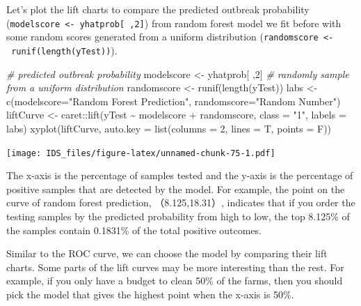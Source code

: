 \documentclass[
  12pt,
]{krantz}
\makeatletter
\newenvironment{Shaded}{\begin{snugshade}}{\end{snugshade}}
\newcommand{\AttributeTok}[1]{\textcolor[rgb]{0.61,0.61,0.61}{#1}}
\newcommand{\CommentTok}[1]{\textcolor[rgb]{0.37,0.37,0.37}{\textit{#1}}}
\newcommand{\DecValTok}[1]{\textcolor[rgb]{0.06,0.06,0.06}{#1}}
\newcommand{\FunctionTok}[1]{\textcolor[rgb]{0,0,0}{#1}}
\newcommand{\NormalTok}[1]{#1}
\newcommand{\OtherTok}[1]{\textcolor[rgb]{0.37,0.37,0.37}{#1}}
\newcommand{\SpecialCharTok}[1]{\textcolor[rgb]{0,0,0}{#1}}
\newcommand{\StringTok}[1]{\textcolor[rgb]{0.5,0.5,0.5}{#1}}
\newenvironment{kframe}{%
\medskip{}
\setlength{\fboxsep}{.8em}
 \def\at@end@of@kframe{}%
 \ifinner\ifhmode%
  \def\at@end@of@kframe{\end{minipage}}%
  \begin{minipage}{\columnwidth}%
 \fi\fi%
 \def\FrameCommand##1{\hskip\@totalleftmargin \hskip-\fboxsep
 \colorbox{shadecolor}{##1}\hskip-\fboxsep
     \hskip-\linewidth \hskip-\@totalleftmargin \hskip\columnwidth}%
 \MakeFramed {\advance\hsize-\width
   \@totalleftmargin\z@ \linewidth\hsize
   \@setminipage}}%
 {\par\unskip\endMakeFramed%
 \at@end@of@kframe}
\renewenvironment{Shaded}{\begin{kframe}}{\end{kframe}}
\makeatother
\begin{document}
Let's plot the lift charts to compare the predicted outbreak probability (\texttt{modelscore\ \textless{}-\ yhatprob{[}\ ,2{]}}) from random forest model we fit before with some random scores generated from a uniform distribution (\texttt{randomscore\ \textless{}-\ runif(length(yTest))}).

\begin{Shaded}
\begin{Highlighting}[]
\CommentTok{\# predicted outbreak probability}
\NormalTok{modelscore }\OtherTok{\textless{}{-}}\NormalTok{ yhatprob[ ,}\DecValTok{2}\NormalTok{]}
\CommentTok{\# randomly sample from a uniform distribution}
\NormalTok{randomscore }\OtherTok{\textless{}{-}} \FunctionTok{runif}\NormalTok{(}\FunctionTok{length}\NormalTok{(yTest))}
\NormalTok{labs }\OtherTok{\textless{}{-}} \FunctionTok{c}\NormalTok{(}\AttributeTok{modelscore=}\StringTok{"Random Forest Prediction"}\NormalTok{,}
        \AttributeTok{randomscore=}\StringTok{"Random Number"}\NormalTok{)}
\NormalTok{liftCurve }\OtherTok{\textless{}{-}}\NormalTok{ caret}\SpecialCharTok{::}\FunctionTok{lift}\NormalTok{(yTest }\SpecialCharTok{\textasciitilde{}}\NormalTok{ modelscore }\SpecialCharTok{+}\NormalTok{ randomscore,}
                  \AttributeTok{class =} \StringTok{"1"}\NormalTok{, }
                  \AttributeTok{labels =}\NormalTok{ labs)}
\FunctionTok{xyplot}\NormalTok{(liftCurve, }\AttributeTok{auto.key =} \FunctionTok{list}\NormalTok{(}\AttributeTok{columns =} \DecValTok{2}\NormalTok{, }\AttributeTok{lines =}\NormalTok{ T, }\AttributeTok{points =}\NormalTok{ F))}
\end{Highlighting}
\end{Shaded}

\texttt{[image: IDS\_files/figure-latex/unnamed-chunk-75-1.pdf]}

The x-axis is the percentage of samples tested and the y-axis is the percentage of positive samples that are detected by the model. For example, the point on the curve of random forest prediction, （8.125,18.31）, indicates that if you order the testing samples by the predicted probability from high to low, the top 8.125\% of the samples contain 0.1831\% of the total positive outcomes.

Similar to the ROC curve, we can choose the model by comparing their lift charts. Some parts of the lift curves may be more interesting than the rest. For example, if you only have a budget to clean 50\% of the farms, then you should pick the model that gives the highest point when the x-axis is 50\%.
\end{document}
